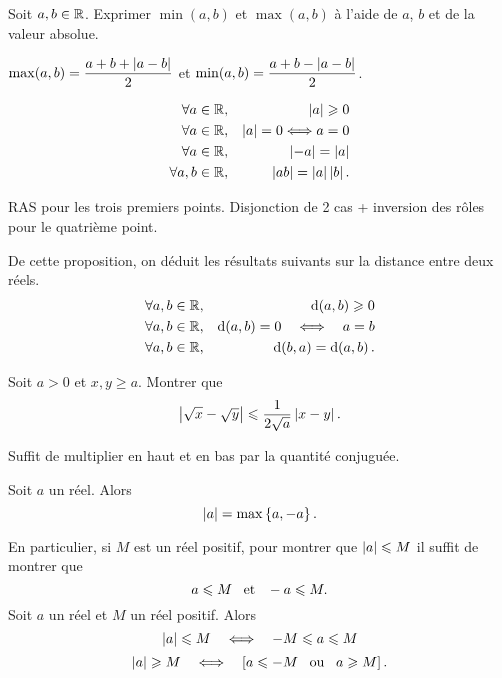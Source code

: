 \documentclass{magnolia}
\begin{document}
\begin{exoUnique}
\exo Soit $a,b\in\mathbb{R}$. Exprimer $\min(a,b)$ et $\max(a,b)$
  à l'aide de $a$, $b$ et de la valeur absolue.
\end{exoUnique}
\begin{sol}
$\max(a,b)=\dfrac{a+b+\left|a-b\right|}{2}$ et $\min(a,b)=\dfrac{a+b-\left|a-b\right|}{2}$.
\end{sol}

\begin{proposition}
\begin{eqnarray*}
\forall a\in\mathbb{R}, & & \left|a\right|\geqslant 0\\
\forall a\in\mathbb{R}, & & \left|a\right|=0 \Longleftrightarrow a=0\\
\forall a\in\mathbb{R}, & & \left|-a\right|=\left|a\right|\\
\forall a,b\in\mathbb{R}, & & \left|ab\right|=\left|a\right|\left|b\right|.
\end{eqnarray*}
\end{proposition}
\begin{preuve}
RAS pour les trois premiers points. Disjonction de 2 cas + inversion des rôles pour le quatrième point.
\end{preuve}

\begin{remarques}
\remarque De cette proposition, on déduit les résultats suivants sur la distance
  entre deux réels.
  \begin{eqnarray*}
  \forall a,b\in\mathbb{R}, & & {\rm d}\!\left(a,b\right)\geqslant 0\\
  \forall a,b\in\mathbb{R}, & & {\rm d}\!\left(a,b\right)=0 \quad\Longleftrightarrow\quad a=b\\
  \forall a,b\in\mathbb{R}, & & {\rm d}\!\left(b,a\right)={\rm d}\!\left(a,b\right).
  \end{eqnarray*}
\end{remarques}

\begin{exoUnique}
\exo Soit $a>0$ et $x,y\geq a$. Montrer que
  \[\left|\sqrt{x}-\sqrt{y}\right|\leqslant\frac{1}{2\sqrt{a}}\left|x-y\right|.\]
	\begin{sol}
	Suffit de multiplier en haut et en bas par la quantité conjuguée.
	\end{sol}
\end{exoUnique}



\begin{proposition}
Soit $a$ un réel. Alors
\[\left|a\right|=\max\left\{a,-a\right\}.\]
\end{proposition}

\begin{remarques}
\remarque En particulier, si $M$ est un réel positif, pour montrer que
  $\left|a\right|\leqslant M$ il suffit de montrer que
  \[a\leqslant M \quad\!\text{et}\quad\! -a\leqslant M.\] 
\remarque Soit $a$ un réel et $M$ un réel positif. Alors
  \[\left|a\right|\leqslant M \quad\Longleftrightarrow\quad -M\leqslant a\leqslant M\]
  \[\left|a\right|\geqslant M \quad\Longleftrightarrow\quad \left[a\leqslant -M \quad\!\text{ou}\quad\! a\geqslant M\right].\]
\end{remarques}
\end{document}
